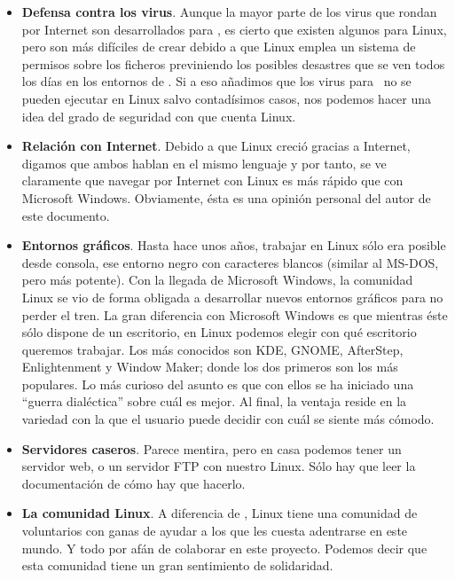 \begin{itemize}
\item {\bf  Defensa contra los  virus}. Aunque  la mayor parte  de los
virus  que rondan  por Internet  son desarrollados  para \windows,  es
cierto que existen algunos para Linux, pero son más difíciles de crear
debido a  que Linux emplea un  sistema de permisos sobre  los ficheros
previniendo los  posibles desastres que se  ven todos los días  en los
entornos de \windows.  Si a eso añadimos que los  virus para \windows\
no se pueden  ejecutar en Linux salvo contadísimos  casos, nos podemos
hacer una idea del grado de seguridad con que cuenta Linux.

\item {\bf Relación con Internet}. Debido a que Linux creció gracias a
Internet, digamos que  ambos hablan en el mismo lenguaje  y por tanto,
se ve claramente que navegar por  Internet con Linux es más rápido que
con Microsoft  Windows. Obviamente, ésta  es una opinión  personal del
autor de este documento.

\item {\bf Entornos gráficos}. Hasta hace unos años, trabajar en Linux
sólo  era posible  desde  consola, ese  entorno  negro con  caracteres
blancos  (similar al  MS-DOS, pero  más  potente). Con  la llegada  de
Microsoft  Windows, la  comunidad Linux  se  vio de  forma obligada  a
desarrollar  nuevos  entornos gráficos  para  no  perder el  tren.  La
gran  diferencia  con Microsoft  Windows  es  que mientras  éste  sólo
dispone de un  escritorio, en Linux podemos elegir  con qué escritorio
queremos trabajar. Los más conocidos  son {\sf KDE}, {\sf GNOME}, {\sf
AfterStep}, {\sf  Enlightenment} y {\sf  Window Maker}; donde  los dos
primeros son los  más populares. Lo más curioso del  asunto es que con
ellos se ha iniciado una ``guerra dialéctica'' sobre cuál es mejor. Al
final, la  ventaja reside en la  variedad con la que  el usuario puede
decidir con cuál se siente más cómodo.

\item {\bf Servidores  caseros}. Parece mentira, pero  en casa podemos
tener un servidor  web, o un servidor FTP con  nuestro Linux. Sólo hay
que leer la documentación de cómo hay que hacerlo.

\item {\bf La comunidad Linux}.  A diferencia de \windows, Linux tiene
una comunidad de voluntarios con ganas  de ayudar a los que les cuesta
adentrarse  en este  mundo.  Y  todo por  afán  de  colaborar en  este
proyecto. Podemos decir  que esta comunidad tiene  un gran sentimiento
de solidaridad.

\end{itemize}

